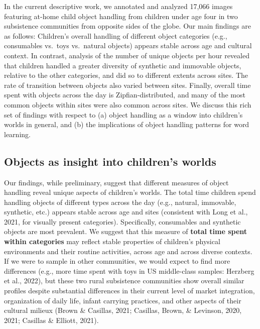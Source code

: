 \documentclass[10pt, letterpaper]{article}
\begin{document}
In the current descriptive work, we annotated and analyzed 17,066 images
featuring at-home child object handling from children under age four in
two subsistence communities from opposite sides of the globe. Our main
findings are as follows: Children's overall handling of different object
categories (e.g., consumables vs.~toys vs.~natural objects) appears
stable across age and cultural context. In contrast, analysis of the
number of unique objects per hour revealed that children handled a
greater diversity of synthetic and immovable objects, relative to the
other categories, and did so to different extents across sites. The rate
of transition between objects also varied between sites. Finally,
overall time spent with objects across the day is Zipfian-distributed,
and many of the most common objects within sites were also common across
sites. We discuss this rich set of findings with respect to (a) object
handling as a window into children's worlds in general, and (b) the
implications of object handling patterns for word learning.

\hypertarget{objects-as-insight-into-childrens-worlds}{%
\subsection{Objects as insight into children's
worlds}\label{objects-as-insight-into-childrens-worlds}}

Our findings, while preliminary, suggest that different measures of
object handling reveal unique aspects of children's worlds. The total
time children spend handling objects of different types across the day
(e.g., natural, immovable, synthetic, etc.) appears stable across age
and sites (consistent with Long et al., 2021, for visually present
categories). Specifically, consumables and synthetic objects are most
prevalent. We suggest that this measure of \textbf{total time spent
within categories} may reflect stable properties of children's physical
environments and their routine activities, across age and across diverse
contexts. If we were to sample in other communities, we would expect to
find more differences (e.g., more time spent with toys in US
middle-class samples: Herzberg et al., 2022), but these two rural
subsistence communities show overall similar profiles despite
substantial differences in their current level of market integration,
organization of daily life, infant carrying practices, and other aspects
of their cultural milieux (Brown \& Casillas, 2021; Casillas, Brown, \&
Levinson, 2020, 2021; Casillas \& Elliott, 2021).
\end{document}
